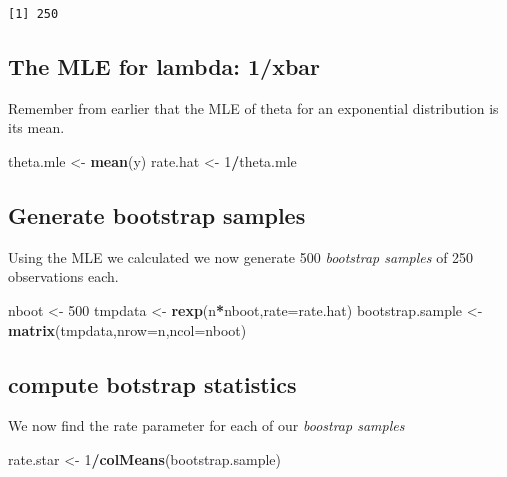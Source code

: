 \documentclass[]{book}
\newenvironment{Shaded}{\begin{snugshade}}{\end{snugshade}}
\newcommand{\KeywordTok}[1]{\textcolor[rgb]{0.13,0.29,0.53}{\textbf{#1}}}
\newcommand{\DataTypeTok}[1]{\textcolor[rgb]{0.13,0.29,0.53}{#1}}
\newcommand{\DecValTok}[1]{\textcolor[rgb]{0.00,0.00,0.81}{#1}}
\newcommand{\StringTok}[1]{\textcolor[rgb]{0.31,0.60,0.02}{#1}}
\newcommand{\OperatorTok}[1]{\textcolor[rgb]{0.81,0.36,0.00}{\textbf{#1}}}
\newcommand{\NormalTok}[1]{#1}
\theoremstyle{definition}
\theoremstyle{definition}
\theoremstyle{definition}
\theoremstyle{remark}
\begin{document}
\begin{verbatim}
[1] 250
\end{verbatim}

\subsection{The MLE for lambda: 1/xbar}\label{the-mle-for-lambda-1xbar}

Remember from earlier that the MLE of theta for an exponential
distribution is its mean.

\begin{Shaded}
\begin{Highlighting}[]
\NormalTok{theta.mle <-}\StringTok{ }\KeywordTok{mean}\NormalTok{(y)}
\NormalTok{rate.hat <-}\StringTok{ }\DecValTok{1}\OperatorTok{/}\NormalTok{theta.mle}
\end{Highlighting}
\end{Shaded}

\subsection{Generate bootstrap
samples}\label{generate-bootstrap-samples}

Using the MLE we calculated we now generate 500 \emph{bootstrap samples}
of 250 observations each.

\begin{Shaded}
\begin{Highlighting}[]
\NormalTok{nboot <-}\StringTok{ }\DecValTok{500}
\NormalTok{tmpdata <-}\StringTok{ }\KeywordTok{rexp}\NormalTok{(n}\OperatorTok{*}\NormalTok{nboot,}\DataTypeTok{rate=}\NormalTok{rate.hat)}
\NormalTok{bootstrap.sample <-}\StringTok{ }\KeywordTok{matrix}\NormalTok{(tmpdata,}\DataTypeTok{nrow=}\NormalTok{n,}\DataTypeTok{ncol=}\NormalTok{nboot)}
\end{Highlighting}
\end{Shaded}

\subsection{compute botstrap
statistics}\label{compute-botstrap-statistics}

We now find the rate parameter for each of our \emph{boostrap samples}

\begin{Shaded}
\begin{Highlighting}[]
\NormalTok{rate.star <-}\StringTok{ }\DecValTok{1}\OperatorTok{/}\KeywordTok{colMeans}\NormalTok{(bootstrap.sample)}
\end{Highlighting}
\end{Shaded}
\end{document}
